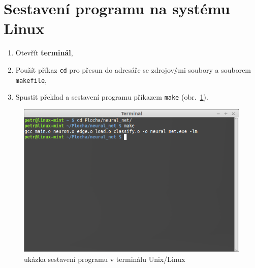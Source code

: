 \documentclass[12pt, a4paper, titlepage]{report}
\begin{document}
\section{Sestavení programu na systému Linux}
\begin{enumerate}
\item Otevřít \textbf{terminál},
\item Použít příkaz \texttt{cd} pro přesun do adresáře se zdrojovými soubory a souborem \texttt{makefile},
\item Spustit překlad a sestavení programu příkazem \texttt{make} (obr.~\ref{fig:term}).
\end{enumerate}
\begin{figure}[htbp]
    \centering
    \includegraphics[width=12cm]{img/term.png}
    \caption{ukázka sestavení programu v terminálu Unix/Linux}
    \label{fig:term}
\end{figure}
\end{document}
